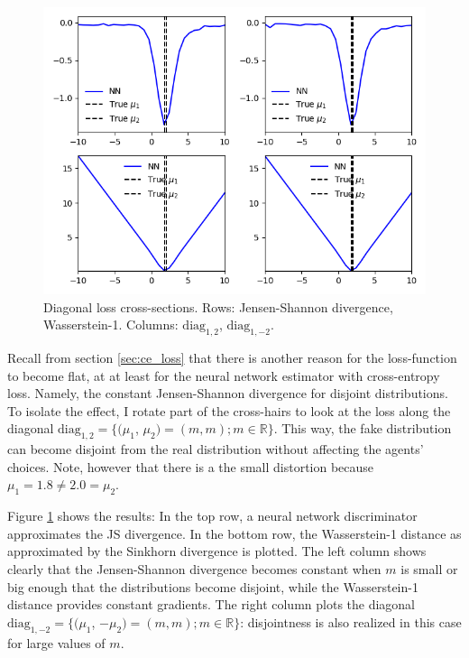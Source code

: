 \begin{figure}
    \includegraphics[width=\textwidth]{./Images/diagonal_loss_plots CE wasserstein-1.png} %
    \caption{Diagonal loss cross-sections. Rows: Jensen-Shannon divergence, Wasserstein-1. Columns: $\text{diag}_{1,2}$, $\text{diag}_{1,-2}$.}
    \label{fig:diagonal_loss_plots}
\end{figure}

Recall from section \ref{sec:ce_loss} that there is another reason for the loss-function to become flat,
at at least for the neural network estimator with cross-entropy loss.
Namely, the constant Jensen-Shannon divergence for disjoint distributions.
To isolate the effect, I rotate part of the cross-hairs to look at the loss along the diagonal $\text{diag}_{1,2} = \{(\mu_1$, $\mu_2) = (m, m); m \in \mathbb{R}\}$.
This way, the fake distribution can become disjoint from the real distribution without affecting the agents' choices.
Note, however that there is a the small distortion because $\mu_1 = 1.8 \neq 2.0 = \mu_2$.

Figure \ref{fig:diagonal_loss_plots} shows the results:
In the top row, a neural network discriminator approximates the JS divergence.
In the bottom row, the Wasserstein-1 distance as approximated by the Sinkhorn divergence is plotted.
The left column shows clearly that the Jensen-Shannon divergence becomes constant when $m$ is small or big enough that the distributions become disjoint, while the Wasserstein-1 distance provides constant gradients.
The right column plots the diagonal $\text{diag}_{1,-2} = \{(\mu_1$, $-\mu_2) = (m, m); m \in \mathbb{R}\}$: disjointness is also realized in this case for large values of $m$.

